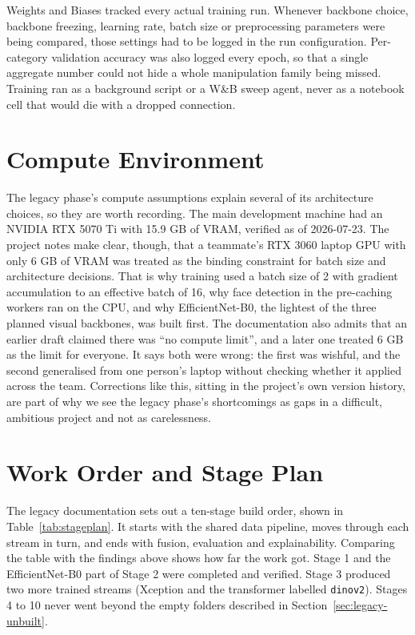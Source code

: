 Weights and Biases tracked every actual training run. Whenever backbone choice,
backbone freezing, learning rate, batch size or preprocessing parameters were
being compared, those settings had to be logged in the run configuration.
Per-category validation accuracy was also logged every epoch, so that a single
aggregate number could not hide a whole manipulation family being missed.
Training ran as a background script or a W\&B sweep agent, never as a notebook
cell that would die with a dropped connection.

\section{Compute Environment}

The legacy phase's compute assumptions explain several of its architecture
choices, so they are worth recording. The main development machine had an
NVIDIA RTX 5070 Ti with 15.9 GB of VRAM, verified as of 2026-07-23. The
project notes make clear, though, that a teammate's RTX 3060 laptop GPU with
only 6 GB of VRAM was treated as the binding constraint for batch size and
architecture decisions. That is why training used a batch size of 2 with
gradient accumulation to an effective batch of 16, why face detection in the
pre-caching workers ran on the CPU, and why EfficientNet-B0, the lightest of
the three planned visual backbones, was built first. The documentation also
admits that an earlier draft claimed there was ``no compute limit'', and a
later one treated 6 GB as the limit for everyone. It says both were wrong: the
first was wishful, and the second generalised from one person's laptop without
checking whether it applied across the team. Corrections like this, sitting in
the project's own version history, are part of why we see the legacy phase's
shortcomings as gaps in a difficult, ambitious project and not as carelessness.

\section{Work Order and Stage Plan}

The legacy documentation sets out a ten-stage build order, shown in
Table~\ref{tab:stageplan}. It starts with the shared data pipeline, moves
through each stream in turn, and ends with fusion, evaluation and
explainability. Comparing the table with the findings above shows how far the
work got. Stage 1 and the EfficientNet-B0 part of Stage 2 were completed and
verified. Stage 3 produced two more trained streams (Xception and the
transformer labelled \texttt{dinov2}). Stages 4 to 10 never went beyond the
empty folders described in Section~\ref{sec:legacy-unbuilt}.

